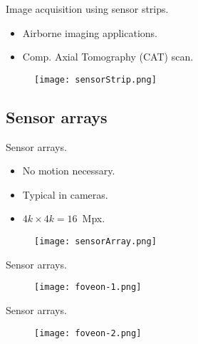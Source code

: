 
\begin{frame}
Image acquisition using sensor strips.
\begin{itemize}
\item Airborne imaging applications.
\item Comp. Axial Tomography (CAT) scan.
\end{itemize}
\begin{figure}
\texttt{[image: sensorStrip.png]}
\end{figure}
\end{frame}


\subsection{Sensor arrays}


\begin{frame}
Sensor arrays.
\begin{itemize}
\item No motion necessary.
\item Typical in cameras.
\item $4k \times 4k = 16$~Mpx.
\end{itemize}
\begin{figure}
\texttt{[image: sensorArray.png]}
\end{figure}
\end{frame}


\begin{frame}
Sensor arrays.
\begin{figure}
\texttt{[image: foveon-1.png]}
\end{figure}
\end{frame}


\begin{frame}
Sensor arrays.
\begin{figure}
\texttt{[image: foveon-2.png]}
\end{figure}
\end{frame}

